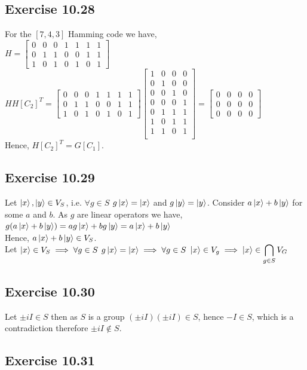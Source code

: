 \documentclass[a4paper,12pt]{article}
\begin{document}
\subsection*{Exercise 10.28}
For the $[7,4,3]$ Hamming code we have,\\
$H=
\begin{bmatrix}
    0&0&0&1&1&1&1\\
    0&1&1&0&0&1&1\\
    1&0&1&0&1&0&1
\end{bmatrix}$\\
$HH[C_2]^T=\begin{bmatrix}
    0&0&0&1&1&1&1\\
    0&1&1&0&0&1&1\\
    1&0&1&0&1&0&1
\end{bmatrix}
\begin{bmatrix}
    1&0&0&0\\
    0&1&0&0\\
    0&0&1&0\\
    0&0&0&1\\
    0&1&1&1\\
    1&0&1&1\\
    1&1&0&1\\
\end{bmatrix}=
\begin{bmatrix}
    0&0&0&0\\
    0&0&0&0\\
    0&0&0&0
\end{bmatrix}$\\
Hence, $H[C_2]^T=G[C_1]$.
\subsection*{Exercise 10.29}
Let $\ket{x},\ket{y}\in V_S$, i.e. $\forall g\in S$ 
$g\ket{x}=\ket{x}$ and $g\ket{y}=\ket{y}$. Consider $a\ket{x}+b\ket{y}$
for some $a$ and $b$. As $g$ are linear operators we have,\\
$g(a\ket{x}+b\ket{y})=ag\ket{x}+bg\ket{y}=a\ket{x}+b\ket{y}$\\
Hence, $a\ket{x}+b\ket{y}\in V_S$.\\
Let $\ket{x}\in V_S\implies \forall g\in S$ $g\ket{x}=\ket{x}\implies \forall
g\in S$ $\ket{x}\in V_g\implies \ket{x}\in \displaystyle \bigcap_{g\in S}V_G$ 
\subsection*{Exercise 10.30}
Let $\pm iI\in S$ then as $S$ is a group $(\pm iI)(\pm iI)\in S$, hence $-I\in S$, which
is a contradiction therefore $\pm iI\notin S$.
\subsection*{Exercise 10.31} 
\end{document}
